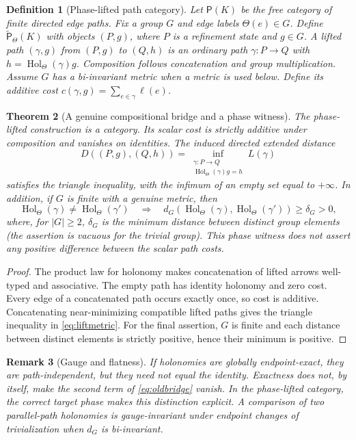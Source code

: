 \documentclass[11pt,letterpaper]{article}
\newtheorem{theorem}{Theorem}[section]
\newtheorem{definition}[theorem]{Definition}
\newtheorem{remark}[theorem]{Remark}
\begin{document}
\begin{definition}[Phase-lifted path category]\label{def:phaselift}
Let $\mathsf P(K)$ be the free category of finite directed edge paths.
Fix a group $G$ and edge labels $\Theta(e)\in G$.
Define $\widetilde{\mathsf P}_\Theta(K)$ with objects $(P,g)$,
where $P$ is a refinement state and $g\in G$.
A lifted path $(\gamma,g)$ from $(P,g)$ to $(Q,h)$ is an ordinary
path $\gamma:P\to Q$ with $h=\operatorname{Hol}_\Theta(\gamma)g$.
Composition follows concatenation and group multiplication.
Assume $G$ has a bi-invariant metric when a metric is used below.
Define its \emph{additive cost} $c(\gamma,g)=\sum_{e\in\gamma}\ell(e)$.
\end{definition}

\begin{theorem}[A genuine compositional bridge and a phase witness]\label{thm:lift}
The phase-lifted construction is a category. Its scalar cost is
strictly additive under composition and vanishes on identities.
The induced directed extended distance
\begin{equation}\label{eq:liftmetric}
D((P,g),(Q,h))
=\inf_{\substack{\gamma:P\to Q\\
       \operatorname{Hol}_\Theta(\gamma)g=h}}L(\gamma)
\end{equation}
satisfies the triangle inequality, with the infimum of an empty set equal
to $+\infty$. In addition, if $G$ is finite with a genuine metric, then
\[
\operatorname{Hol}_\Theta(\gamma)\ne
\operatorname{Hol}_\Theta(\gamma')
\quad\Longrightarrow\quad
 d_G(\operatorname{Hol}_\Theta(\gamma),
      \operatorname{Hol}_\Theta(\gamma'))\ge\delta_G>0,
\]
where, for $|G|\ge2$, $\delta_G$ is the minimum distance between distinct group elements (the assertion is vacuous for the trivial group).
This \emph{phase witness} does not assert any positive difference between
the scalar path costs.
\end{theorem}
\begin{proof}
The product law for holonomy makes concatenation of lifted arrows
well-typed and associative. The empty path has identity holonomy and zero
cost. Every edge of a concatenated path occurs exactly once, so cost is
additive. Concatenating near-minimizing compatible lifted paths gives the
triangle inequality in \eqref{eq:liftmetric}. For the final assertion,
$G$ is finite and each distance between distinct elements is strictly
positive, hence their minimum is positive.
\end{proof}

\begin{remark}[Gauge and flatness]
If holonomies are globally endpoint-exact, they are path-independent,
but they need not equal the identity. Exactness does not, by itself, make
the second term of \eqref{eq:oldbridge} vanish. In the phase-lifted category,
the correct target phase makes this distinction explicit. A comparison of
two parallel-path holonomies is gauge-invariant under endpoint changes of
trivialization when $d_G$ is bi-invariant.
\end{remark}
\end{document}
